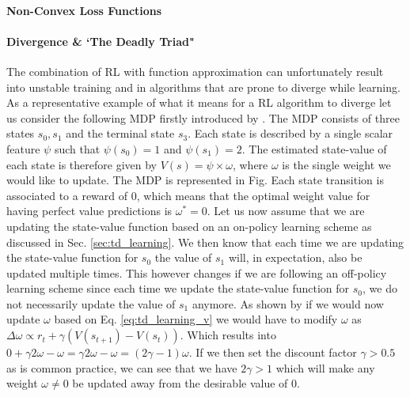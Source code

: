 \paragraph{Non-Convex Loss Functions}


\paragraph{Divergence \& `The Deadly Triad"}
The combination of RL with function approximation can unfortunately result into unstable training and in algorithms that are prone to diverge while learning. As a representative example of what it means for a RL algorithm to diverge let us consider the following MDP firstly introduced by \citet{tsitsiklis1997analysis}. The MDP consists of three states $s_0, s_1$ and the terminal state $s_3$. Each state is described by a single scalar feature $\psi$ such that $\psi(s_0)=1$ and $\psi(s_1)=2$. The estimated state-value of each state is therefore given by $V(s)=\psi \times \omega$, where $\omega$ is the single weight we would like to update. The MDP is represented in Fig.  Each state transition is associated to a reward of $0$, which means that the optimal weight value for having perfect value predictions is $\omega^{*}=0$. Let us now assume that we are updating the state-value function based on an on-policy learning scheme as discussed in Sec. \ref{sec:td_learning}. We then know that each time we are updating the state-value function for $s_0$ the value of $s_1$ will, in expectation, also be updated multiple times. This however changes if we are following an off-policy learning scheme since each time we update the state-value function for $s_0$, we do not necessarily update the value of $s_1$ anymore. As shown by \citet{van2018deep_triad} if we would now update $\omega$ based on Eq. \ref{eq:td_learning_v} we would have to modify $\omega$ as $\Delta \omega \propto r_t +\gamma(V(s_{t+1})-V(s_t))$. Which results into $0+\gamma2\omega-\omega=\gamma2\omega-\omega=(2\gamma-1)\omega$. If we then set the discount factor $\gamma>0.5$ as is common practice, we can see that we have $2\gamma>1$ which will make any weight $\omega\neq0$  be updated away from the desirable value of $0$.

